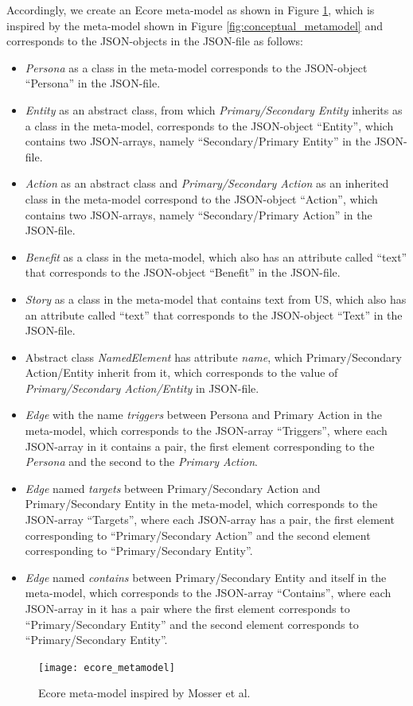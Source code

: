 Accordingly, we create an Ecore meta-model as shown in Figure \ref{fig:design_ecore_meta_model}, which is inspired by the meta-model shown in Figure \ref{fig:conceptual_metamodel} and corresponds to the JSON-objects in the JSON-file as follows:
\begin{itemize}
	\item \textit{Persona} as a class in the meta-model corresponds to the JSON-object \enquote{Persona} in the JSON-file.
	\item \textit{Entity} as an abstract class, from which \textit{Primary/Secondary Entity} inherits as a class in the meta-model, corresponds to the JSON-object \enquote{Entity}, which contains two JSON-arrays, namely \enquote{Secondary/Primary Entity} in the JSON-file.
	\item \textit{Action} as an abstract class and \textit{Primary/Secondary Action} as an inherited class in the meta-model correspond to the JSON-object \enquote{Action}, which contains two JSON-arrays, namely \enquote{Secondary/Primary Action} in the JSON-file.
	\item \textit{Benefit} as a class in the meta-model, which also has an attribute called \enquote{text} that corresponds to the JSON-object \enquote{Benefit} in the JSON-file.
	\item \textit{Story} as a class in the meta-model that contains text from US, which also has an attribute called \enquote{text} that corresponds to the JSON-object \enquote{Text} in the JSON-file.
	\item Abstract class \textit{NamedElement} has attribute \textit{name}, which Primary/Secondary Action/Entity inherit from it, which corresponds to the value of \textit{Primary/Secondary Action/Entity} in JSON-file.
	\item \textit{Edge} with the name \textit{triggers} between Persona and Primary Action in the meta-model, which corresponds to the JSON-array \enquote{Triggers}, where each JSON-array in it contains a pair, the first element corresponding to the \textit{Persona} and the second to the \textit{Primary Action}.
	\item \textit{Edge} named \textit{targets} between Primary/Secondary Action and Primary/Secondary Entity in the meta-model, which corresponds to the JSON-array \enquote{Targets}, where each JSON-array has a pair, the first element corresponding to \enquote{Primary/Secondary Action} and the second element corresponding to \enquote{Primary/Secondary Entity}.
	\item \textit{Edge} named \textit{contains} between Primary/Secondary Entity and itself in the meta-model, which corresponds to the JSON-array \enquote{Contains}, where each JSON-array in it has a pair where the first element corresponds to \enquote{Primary/Secondary Entity} and the second element corresponds to \enquote{Primary/Secondary Entity}.
\end{itemize}
\begin{figure}[h]
	\centering
	\texttt{[image: ecore\_metamodel]}
	\caption{Ecore meta-model inspired by Mosser et al. \cite{mosser2022modelling}}\label{fig:design_ecore_meta_model}
\end{figure}
